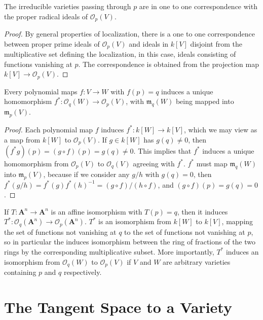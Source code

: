 \begin{prop}
    The irreducible varieties passing through $p$ are in one to one correspondence with the proper radical ideals of $\mathcal{O}_p(V)$.
\end{prop}
\begin{proof}
    By general properties of localization, there is a one to one correspondence between proper prime ideals of $\mathcal{O}_p(V)$ and ideals in $k[V]$ disjoint from the multiplicative set defining the localization, in this case, ideals consisting of functions vanishing at $p$. The correspondence is obtained from the projection map $k[V] \to \mathcal{O}_p(V)$.
\end{proof}

\begin{prop}
    Every polynomial maps $f: V \to W$ with $f(p) = q$ induces a unique homomorphism $f^*: \mathcal{O}_q(W) \to \mathcal{O}_p(V)$, with $\mathfrak{m}_q(W)$ being mapped into $\mathfrak{m}_p(V)$.
\end{prop}
\begin{proof}
    Each polynomial map $f$ induces $f^*: k[W] \to k[V]$, which we may view as a map from $k[W]$ to $\mathcal{O}_p(V)$. If $g \in k[W]$ has $g(q) \neq 0$, then $(f^* g)(p) = (g \circ f)(p) = g(q) \neq 0$. This implies that $f^*$ induces a unique homomorphism from $\mathcal{O}_p(V)$ to $\mathcal{O}_q(V)$ agreeing with $f^*$. $f^*$ must map $\mathfrak{m}_q(W)$ into $\mathfrak{m}_p(V)$, because if we consider any $g/h$ with $g(q) = 0$, then $f^*(g/h) = f^*(g)f^*(h)^{-1} = (g \circ f)/(h \circ f)$, and $(g \circ f)(p) = g(q) = 0$.
\end{proof}

If $T: \mathbf{A}^n \to \mathbf{A}^n$ is an affine isomorphism with $T(p) = q$, then it induces $T^*: \mathcal{O}_q(\mathbf{A}^n) \to \mathcal{O}_p(\mathbf{A}^n)$. $T^*$ is an isomorphism from $k[W]$ to $k[V]$, mapping the set of functions not vanishing at $q$ to the set of functions not vanishing at $p$, so in particular the induces isomorphism between the ring of fractions of the two rings by the corresponding multiplicative subset. More importantly, $T^*$ induces an isomorphism from $\mathcal{O}_q(W)$ to $\mathcal{O}_p(V)$ if $V$ and $W$ are arbitrary varieties containing $p$ and $q$ respectively.

\section{The Tangent Space to a Variety}


